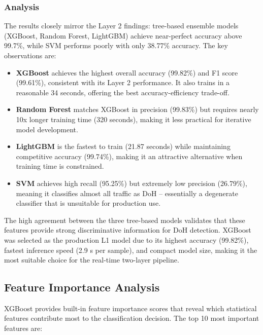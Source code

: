 \documentclass[../Main.tex]{subfiles}
\begin{document}
\subsubsection{Analysis}

The results closely mirror the Layer 2 findings: tree-based ensemble models (XGBoost, Random Forest, LightGBM) achieve near-perfect accuracy above 99.7\%, while SVM performs poorly with only 38.77\% accuracy. The key observations are:

\begin{itemize}
    \item \textbf{XGBoost} achieves the highest overall accuracy (99.82\%) and F1 score (99.61\%), consistent with its Layer 2 performance. It also trains in a reasonable 34 seconds, offering the best accuracy-efficiency trade-off.
    \item \textbf{Random Forest} matches XGBoost in precision (99.83\%) but requires nearly 10x longer training time (320 seconds), making it less practical for iterative model development.
    \item \textbf{LightGBM} is the fastest to train (21.87 seconds) while maintaining competitive accuracy (99.74\%), making it an attractive alternative when training time is constrained.
    \item \textbf{SVM} achieves high recall (95.25\%) but extremely low precision (26.79\%), meaning it classifies almost all traffic as DoH -- essentially a degenerate classifier that is unsuitable for production use.
\end{itemize}

The high agreement between the three tree-based models validates that these features provide strong discriminative information for DoH detection. XGBoost was selected as the production L1 model due to its highest accuracy (99.82\%), fastest inference speed (2.9 \textmu s per sample), and compact model size, making it the most suitable choice for the real-time two-layer pipeline.

\subsection{Feature Importance Analysis}
\label{section:4.6.8}

XGBoost provides built-in feature importance scores that reveal which statistical features contribute most to the classification decision. The top 10 most important features are:
\end{document}
